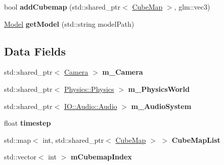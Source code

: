 \begin{DoxyCompactItemize}
\item 
bool {\bfseries add\+Cubemap} (std\+::shared\+\_\+ptr$<$ \hyperlink{class_cube_map}{Cube\+Map} $>$, glm\+::vec3)\hypertarget{class_resource_manager_a8826abe638311f03b8ee850110f1d18e}{}\label{class_resource_manager_a8826abe638311f03b8ee850110f1d18e}

\item 
\hyperlink{class_model}{Model} {\bfseries get\+Model} (std\+::string model\+Path)\hypertarget{class_resource_manager_a27054eafe78f53df38abf67e6f052569}{}\label{class_resource_manager_a27054eafe78f53df38abf67e6f052569}

\end{DoxyCompactItemize}
\subsection*{Data Fields}
\begin{DoxyCompactItemize}
\item 
std\+::shared\+\_\+ptr$<$ \hyperlink{class_camera}{Camera} $>$ {\bfseries m\+\_\+\+Camera}\hypertarget{class_resource_manager_a80b2ea2f322e1431bbc59b2a2a994d11}{}\label{class_resource_manager_a80b2ea2f322e1431bbc59b2a2a994d11}

\item 
std\+::shared\+\_\+ptr$<$ \hyperlink{class_physics_1_1_physics}{Physics\+::\+Physics} $>$ {\bfseries m\+\_\+\+Physics\+World}\hypertarget{class_resource_manager_add34ae6384c490c5689a860bd44af852}{}\label{class_resource_manager_add34ae6384c490c5689a860bd44af852}

\item 
std\+::shared\+\_\+ptr$<$ \hyperlink{class_i_o_1_1_audio_1_1_audio}{I\+O\+::\+Audio\+::\+Audio} $>$ {\bfseries m\+\_\+\+Audio\+System}\hypertarget{class_resource_manager_ab5042cc5d60c068ca1bce6939c87b944}{}\label{class_resource_manager_ab5042cc5d60c068ca1bce6939c87b944}

\item 
float {\bfseries timestep}\hypertarget{class_resource_manager_a07c54e80f53e5d2cf81cb12619bcd16f}{}\label{class_resource_manager_a07c54e80f53e5d2cf81cb12619bcd16f}

\item 
std\+::map$<$ int, std\+::shared\+\_\+ptr$<$ \hyperlink{class_cube_map}{Cube\+Map} $>$ $>$ {\bfseries Cube\+Map\+List}\hypertarget{class_resource_manager_afa304255b6198c2e9dd56c4394a63911}{}\label{class_resource_manager_afa304255b6198c2e9dd56c4394a63911}

\item 
std\+::vector$<$ int $>$ {\bfseries m\+Cubemap\+Index}\hypertarget{class_resource_manager_a64589baa7311486ef730953fc7a04ffb}{}\label{class_resource_manager_a64589baa7311486ef730953fc7a04ffb}

\end{DoxyCompactItemize}
